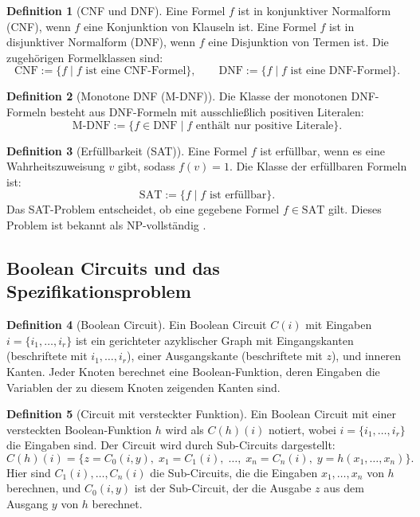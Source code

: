 ﻿\documentclass[a4paper,12pt]{article}
\theoremstyle{definition}
\newtheorem{definition}{Definition}
\begin{document}
\begin{definition}[CNF und DNF]
    Eine Formel $f$ ist in konjunktiver Normalform (CNF), wenn $f$ eine Konjunktion von Klauseln ist. Eine Formel $f$ ist in disjunktiver Normalform (DNF), wenn $f$ eine Disjunktion von Termen ist. Die zugehörigen Formelklassen sind:
    \[
    \text{CNF} := \{ f \mid f \text{ ist eine CNF-Formel} \}, \qquad
    \text{DNF} := \{ f \mid f \text{ ist eine DNF-Formel} \}.
    \]
\end{definition}

\begin{definition}[Monotone DNF (M-DNF)]
    Die Klasse der monotonen DNF-Formeln besteht aus DNF-Formeln mit ausschließlich positiven Literalen:
    \[
    \text{M-DNF} := \{ f \in \text{DNF} \mid f \text{ enthält nur positive Literale} \}.
    \]
\end{definition}

\begin{definition}[Erfüllbarkeit (SAT)]
    Eine Formel $f$ ist erfüllbar, wenn es eine Wahrheitszuweisung $v$ gibt, sodass $f(v) = 1$. Die Klasse der erfüllbaren Formeln ist:
    \[
    \text{SAT} := \{ f \mid f \text{ ist erfüllbar} \}.
    \]
    Das SAT-Problem entscheidet, ob eine gegebene Formel $f \in \text{SAT}$ gilt. Dieses Problem ist bekannt als NP-vollständig \cite{Coo71}.
\end{definition}

\subsection{Boolean Circuits und das Spezifikationsproblem}

\begin{definition}[Boolean Circuit]
    Ein Boolean Circuit $C(i)$ mit Eingaben $i = \{i_1, \ldots, i_r\}$ ist ein gerichteter azyklischer Graph mit Eingangskanten (beschriftete mit $i_1, \ldots, i_r$), einer Ausgangskante (beschriftete mit $z$), und inneren Kanten. Jeder Knoten berechnet eine Boolean-Funktion, deren Eingaben die Variablen der zu diesem Knoten zeigenden Kanten sind.
\end{definition}

\begin{definition}[Circuit mit versteckter Funktion]
    Ein Boolean Circuit mit einer versteckten Boolean-Funktion $h$ wird als $C(h)(i)$ notiert, wobei $i = \{i_1, \ldots, i_r\}$ die Eingaben sind. Der Circuit wird durch Sub-Circuits dargestellt:
    \[
    C(h)(i) = \{ z = C_0(i, y),\; x_1 = C_1(i),\; \ldots,\; x_n = C_n(i),\; y = h(x_1, \ldots, x_n) \}.
    \]
    Hier sind $C_1(i), \ldots, C_n(i)$ die Sub-Circuits, die die Eingaben $x_1, \ldots, x_n$ von $h$ berechnen, und $C_0(i, y)$ ist der Sub-Circuit, der die Ausgabe $z$ aus dem Ausgang $y$ von $h$ berechnet.
\end{definition}
\end{document}
